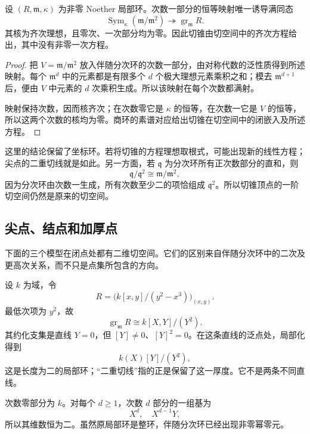 \begin{proposition}
\label{g5:prop:tangent-cone-in-tangent-space}
	设 \((R,\mathfrak m,\kappa)\) 为非零 Noether 局部环。次数一部分的恒等映射唯一诱导满同态
	\[
		\operatorname{Sym}_\kappa(\mathfrak m/\mathfrak m^2)
		\twoheadrightarrow \operatorname{gr}_{\mathfrak m}R.
	\]
	其核为齐次理想，且零次、一次部分均为零。因此切锥由切空间中的齐次方程给出，其中没有非零一次方程。
\end{proposition}
\begin{proof}
	把 \(V=\mathfrak m/\mathfrak m^2\) 放入伴随分次环的次数一部分，由对称代数的泛性质得到所述映射。每个 \(\mathfrak m^d\) 中的元素都是有限多个 \(d\) 个极大理想元素乘积之和；模去 \(\mathfrak m^{d+1}\) 后，便由 \(V\) 中元素的 \(d\) 次乘积生成。所以该映射在每个次数都满射。

	映射保持次数，因而核齐次；在次数零它是 \(\kappa\) 的恒等，在次数一它是 \(V\) 的恒等，所以这两个次数的核均为零。商环的素谱对应给出切锥在切空间中的闭嵌入及所述方程。
\end{proof}

这里的结论保留了坐标环。若将切锥的方程理想取根式，可能出现新的线性方程；尖点的二重切线就是如此。另一方面，若 \(\mathfrak q\) 为分次环所有正次数部分的直和，则
\[
	\mathfrak q/\mathfrak q^2\cong\mathfrak m/\mathfrak m^2,
\]
因为分次环由次数一生成，所有次数至少二的项恰组成 \(\mathfrak q^2\)。所以切锥顶点的一阶切空间仍然是原来的切空间。

\subsection{尖点、结点和加厚点}
\label{g5:subsec:0504:03}

下面的三个模型在闭点处都有二维切空间。它们的区别来自伴随分次环中的二次及更高次关系，而不只是点集所包含的方向。

\begin{example}
\label{g5:exm:cusp-tangent-cone}
	设 \(k\) 为域，令
	\[
		R=\bigl(k[x,y]/(y^2-x^3)\bigr)_{(x,y)}.
	\]
	最低次项为 \(y^2\)，故
	\[
		\operatorname{gr}_{\mathfrak m}R
		\cong k[X,Y]/(Y^2).
	\]
	其约化支集是直线 \(Y=0\)，但 \([Y]\ne0\)、\([Y]^2=0\)。在这条直线的泛点处，局部化得到
	\[
		k(X)[Y]/(Y^2),
	\]
	这是长度为二的局部环；“二重切线”指的正是保留了这一厚度。它不是两条不同直线。

	次数零部分为 \(k\)。对每个 \(d\geq1\)，次数 \(d\) 部分的一组基为
	\[
		X^d,\quad X^{d-1}Y,
	\]
	所以其维数恒为二。虽然原局部环是整环，伴随分次环已经出现非零幂零元。
\end{example}

